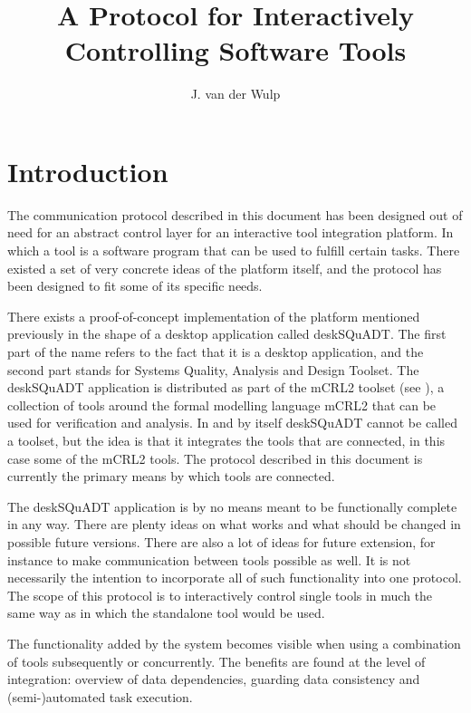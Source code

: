 \documentclass{article}
\title{A Protocol for Interactively Controlling Software Tools}
\author{J. van der Wulp}
\begin{document}
\maketitle

 \section{Introduction}

  The communication protocol described in this document has been designed out
  of need for an abstract control layer for an interactive tool integration
  platform. In which a tool is a software program that can be used to fulfill
  certain tasks. There existed a set of very concrete ideas of the platform
  itself, and the protocol has been designed to fit some of its specific needs.

  There exists a proof-of-concept implementation of the platform mentioned
  previously in the shape of a desktop application called deskSQuADT. The first
  part of the name refers to the fact that it is a desktop application, and the
  second part stands for Systems Quality, Analysis and Design Toolset.  The
  deskSQuADT application is distributed as part of the mCRL2 toolset (see
  \cite{groote_et_al:DSP:2007:862}), a collection of tools around the formal
  modelling language mCRL2 that can be used for verification and analysis.  In
  and by itself deskSQuADT cannot be called a toolset, but the idea is that it
  integrates the tools that are connected, in this case some of the mCRL2
  tools.   The protocol described in this document is currently the primary
  means by which tools are connected.

  The deskSQuADT application is by no means meant to be functionally complete
  in any way. There are plenty ideas on what works and what should be changed
  in possible future versions.  There are also a lot of ideas for future
  extension, for instance to make communication between tools possible as well.
  It is not necessarily the intention to incorporate all of such functionality
  into one protocol. The scope of this protocol is to interactively control
  single tools in much the same way as in which the standalone tool would be
  used.
  
  The functionality added by the system becomes visible when using a
  combination of tools subsequently or concurrently. The benefits are found at
  the level of integration: overview of data dependencies, guarding data
  consistency and (semi-)automated task execution.
\end{document}
